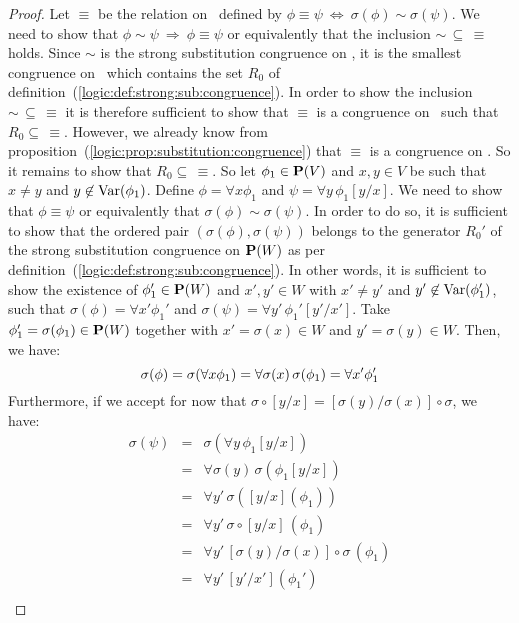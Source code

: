 \begin{proof}
Let $\equiv$ be the relation on \pv\ defined by $\phi\equiv\psi\
\Leftrightarrow\ \sigma(\phi)\sim\sigma(\psi)$. We need to show that
$\phi\sim\psi\ \Rightarrow\ \phi\equiv\psi$ or equivalently that the
inclusion $\sim\,\subseteq\,\equiv$ holds. Since $\sim$ is the
strong substitution congruence on \pv, it is the smallest congruence
on \pv\ which contains the set $R_{0}$ of
definition~(\ref{logic:def:strong:sub:congruence}). In order to show
the inclusion $\sim\,\subseteq\,\equiv$ it is therefore sufficient
to show that $\equiv$ is a congruence on \pv\ such that
$R_{0}\subseteq\,\equiv$. However, we already know from
proposition~(\ref{logic:prop:substitution:congruence}) that $\equiv$
is a congruence on \pv. So it remains to show that
$R_{0}\subseteq\,\equiv$. So let $\phi_{1}\in\mbox{${\bf P}(V)$}$ and $x,y\in V$ be
such that $x\neq y$ and $y\not\in\mbox{\rm Var}(\phi_{1})$. Define
$\phi=\forall x\phi_{1}$ and $\psi=\forall y\,\phi_{1}[y/x]$. We
need to show that $\phi\equiv\psi$ or equivalently that
$\sigma(\phi)\sim\sigma(\psi)$. In order to do so, it is sufficient
to show that the ordered pair $(\sigma(\phi),\sigma(\psi))$ belongs
to the generator $R_{0}'$ of the strong substitution congruence on
${\bf P}(W)$ as per
definition~(\ref{logic:def:strong:sub:congruence}). In other words,
it is sufficient to show the existence of $\phi_{1}'\in{\bf P}(W)$
and $x',y'\in W$ with $x'\neq y'$ and $y'\not\in\mbox{\rm Var}(\phi_{1}')$,
such that $\sigma(\phi)=\forall x'\phi_{1}'$ and
$\sigma(\psi)=\forall y'\,\phi_{1}'[y'/x']$. Take
$\phi_{1}'=\sigma(\phi_{1})\in{\bf P}(W)$ together with
$x'=\sigma(x)\in W$ and $y'=\sigma(y)\in W$. Then, we have:
    \[
    \sigma(\phi)=\sigma(\forall x\phi_{1})\\
        =\forall\sigma(x)\,\sigma(\phi_{1})\\
        =\forall x'\phi_{1}'
    \]
Furthermore, if we accept for now that
$\sigma\circ[y/x]=[\sigma(y)/\sigma(x)]\circ\sigma$, we have:
    \begin{eqnarray*}
    \sigma(\psi)&=&\sigma(\forall y\,\phi_{1}[y/x])\\
    &=&\forall\sigma(y)\,\sigma(\phi_{1}[y/x])\\
    &=&\forall y'\,\sigma([y/x](\phi_{1}))\\
    &=&\forall y'\,\sigma\circ [y/x]\,(\phi_{1})\\
    &=&\forall y'\, [\sigma(y)/\sigma(x)]\circ\sigma\,(\phi_{1})\\
    &=&\forall y'\,[y'/x'](\phi_{1}')\\

\end{eqnarray*}
\end{proof}
